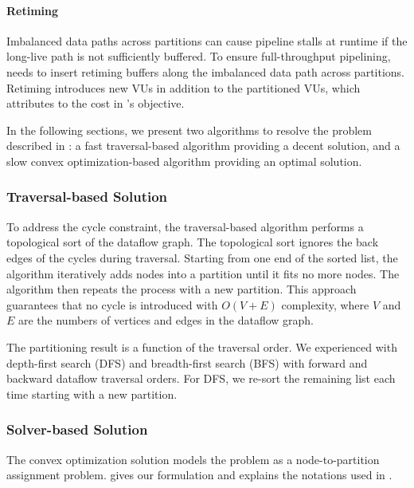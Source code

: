 \paragraph{Retiming}
Imbalanced data paths across partitions can cause pipeline stalls at runtime if the long-live path is not
sufficiently buffered.
To ensure full-throughput pipelining, \name needs to insert retiming buffers along the imbalanced data path across
partitions.
Retiming introduces new VUs in addition to the partitioned VUs, which attributes to the cost in
's objective.

In the following sections, we present two algorithms to resolve the problem described in
:
a fast traversal-based algorithm providing a decent solution, and a slow convex
optimization-based algorithm providing an optimal solution.

\subsubsection{Traversal-based Solution}
To address the cycle constraint, the traversal-based algorithm performs a topological sort of the dataflow graph.
The topological sort ignores the back edges of the cycles during traversal. 
Starting from one end of the sorted list, the algorithm iteratively adds nodes into a partition
until it fits no more nodes. The algorithm then repeats the process with a new partition.
This approach guarantees that no cycle is introduced with $O(V+E)$ complexity, 
where $V$ and $E$ are the numbers of vertices and edges in the dataflow graph.

The partitioning result is a function of the traversal order.
We experienced with depth-first search (DFS) and breadth-first search (BFS) with forward and
backward dataflow traversal orders.
For DFS, we re-sort the remaining list each time starting with a new partition.

\subsubsection{Solver-based Solution}
The convex optimization solution models the problem as a node-to-partition assignment problem.
 gives our formulation and  explains the notations
used in .



